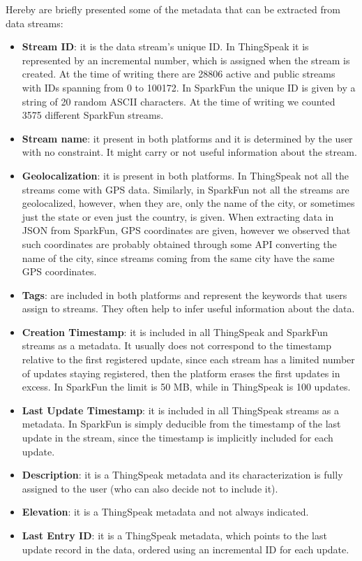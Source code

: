 Hereby are briefly presented some of the metadata that can be extracted from data streams:
\begin{itemize}
 \item \textbf{Stream ID}: it is the data stream's unique ID. In ThingSpeak it is represented by an incremental number, which is assigned when the stream is created. At the time of writing there are 28806 active and public streams with IDs spanning from 0 to 100172. In SparkFun the unique ID is given by a string of 20 random ASCII characters. At the time of writing we counted 3575 different SparkFun streams. 
 \item \textbf{Stream name}: it present in both platforms and it is determined by the user with no constraint. It might carry or not useful information about the stream.
 \item \textbf{Geolocalization}: it is present in both platforms. In ThingSpeak not all the streams come with GPS data. Similarly, in SparkFun not all the streams are geolocalized, however, when they are, only the name of the city, or sometimes just the state or even just the country, is given. When extracting data in JSON from SparkFun, GPS coordinates are given, however we observed that such coordinates are probably obtained through some API converting the name of the city, since streams coming from the same city have the same GPS coordinates.
 \item \textbf{Tags}: are included in both platforms and represent the keywords that users assign to streams. They often help to infer useful information about the data. 
 \item \textbf{Creation Timestamp}: it is included in all ThingSpeak and SparkFun streams as a metadata. It usually does not correspond to the timestamp relative to the first registered update, since each stream has a limited number of updates staying registered, then the platform erases the first updates in excess. In SparkFun the limit is 50 MB, while in ThingSpeak is 100 updates.
 \item \textbf{Last Update Timestamp}: it is included in all ThingSpeak streams as a metadata. In SparkFun is simply deducible from the timestamp of the last update in the stream, since the timestamp is implicitly included for each update.
 \item \textbf{Description}: it is a ThingSpeak metadata and its characterization is fully assigned to the user (who can also decide not to include it).
 \item \textbf{Elevation}: it is a ThingSpeak metadata and not always indicated.
 \item \textbf{Last Entry ID}: it is a ThingSpeak metadata, which points to the last update record in the data, ordered using an incremental ID for each update.
\end{itemize}


